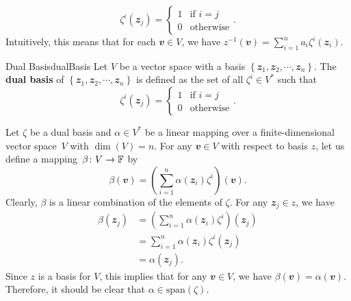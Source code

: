 \documentclass[math]{amznotes}
\theoremstyle{remark}
\begin{document}
\begin{equation*}
    \zeta^i(\mathbfit{z}_j) = \begin{cases}
        1 & \textrm{if } i = j \\
        0 & \textrm{otherwise}
    \end{cases}.
\end{equation*}
Intuitively, this means that for each $\mathbfit{v} \in V$, we have $z^{-1}(\mathbfit{v}) = \sum_{i = 1}^{n}a_i\zeta^i(\mathbfit{z}_i)$.
\begin{dfnbox}{Dual Basis}{dualBasis}
    Let $V$ be a vector space with a basis $\left\{\mathbfit{z}_1, \mathbfit{z}_2, \cdots, \mathbfit{z}_n\right\}$. The {\color{red} \textbf{dual basis}} of $\left\{\mathbfit{z}_1, \mathbfit{z}_2, \cdots, \mathbfit{z}_n\right\}$ is defined as the set of all $\zeta^i \in V^*$ such that 
    \begin{equation*}
        \zeta^i(\mathbfit{z}_j) = \begin{cases}
            1 & \textrm{if } i = j \\
            0 & \textrm{otherwise}
        \end{cases}.
    \end{equation*}
\end{dfnbox}
Let $\zeta$ be a dual basis and $\alpha \in V^*$ be a linear mapping over a finite-dimensional vector space~$V$ with $\dim(V) = n$. For any $\mathbfit{v} \in V$ with respect to basis $z$, let us define a mapping~$\beta \colon V \to \mathbb{F}$ by 
\begin{equation*}
    \beta(\mathbfit{v}) = \left(\sum_{i = 1}^{n}\alpha(\mathbfit{z}_i)\zeta^i\right)(\mathbfit{v}).
\end{equation*}
Clearly, $\beta$ is a linear combination of the elements of $\zeta$. For any $\mathbfit{z}_j \in z$, we have
\begin{align*}
    \beta(\mathbfit{z}_j) & = \left(\sum_{i = 1}^{n}\alpha(\mathbfit{z}_i)\zeta^i\right)(\mathbfit{z}_j) \\
    & = \sum_{i = 1}^{n}\alpha(\mathbfit{z}_i)\zeta^i(\mathbfit{z}_j) \\
    & = \alpha(\mathbfit{z}_j).
\end{align*}
Since $z$ is a basis for $V$, this implies that for any $\mathbfit{v} \in V$, we have $\beta(\mathbfit{v}) = \alpha(\mathbfit{v})$. Therefore, it should be clear that $\alpha \in \mathrm{span}(\zeta)$. 
\end{document}
